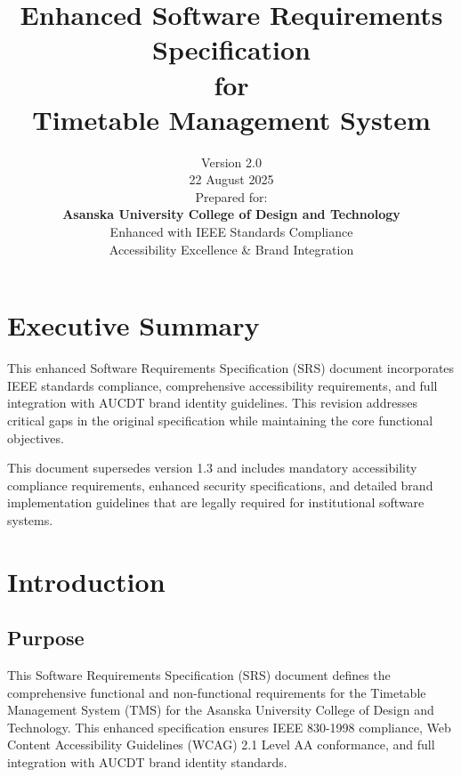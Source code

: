 \documentclass[11pt, a4paper]{article}
\title{
    \vspace{2cm}
    {\poppinsbold\Huge\color{AUCDTBurgundy} Enhanced Software Requirements \\ Specification \\ for \\ Timetable Management System}
    \vspace{1cm}
}
\author{
    {\poppinssemibold\large Version 2.0} \\
    \vspace{0.5cm}
    {\poppinslight\large 22 August 2025} \\
    \vspace{2cm}
    {\poppinsmedium Prepared for:} \\
    \textbf{\poppinssemibold\large Asanska University College of Design and Technology}
    \vspace{1cm} \\
    {\poppinslight Enhanced with IEEE Standards Compliance} \\
    {\poppinslight Accessibility Excellence \& Brand Integration}
}
\date{}
\begin{document}
\maketitle
\thispagestyle{empty}
\newpage

\tableofcontents
\thispagestyle{empty}
\newpage

\setcounter{page}{1}

\section{Executive Summary}
\label{sec:executive_summary}

This enhanced Software Requirements Specification (SRS) document incorporates IEEE standards compliance, comprehensive accessibility requirements, and full integration with AUCDT brand identity guidelines. This revision addresses critical gaps in the original specification while maintaining the core functional objectives.

\begin{criticalbox}
This document supersedes version 1.3 and includes mandatory accessibility compliance requirements, enhanced security specifications, and detailed brand implementation guidelines that are legally required for institutional software systems.
\end{criticalbox}

\section{Introduction}
\label{sec:introduction}

\subsection{Purpose}
\label{sec:purpose}
This Software Requirements Specification (SRS) document defines the comprehensive functional and non-functional requirements for the Timetable Management System (TMS) for the Asanska University College of Design and Technology. This enhanced specification ensures IEEE 830-1998 compliance, Web Content Accessibility Guidelines (WCAG) 2.1 Level AA conformance, and full integration with AUCDT brand identity standards.
\end{document}
